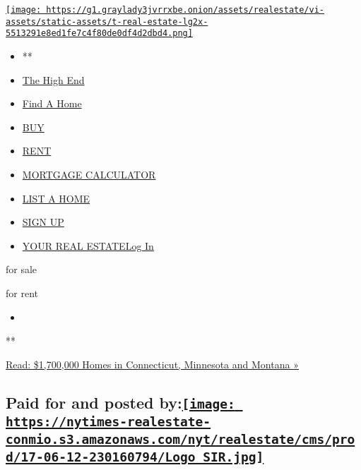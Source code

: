 \href{/section/realestate}{\texttt{[image: https://g1.graylady3jvrrxbe.onion/assets/realestate/vi-assets/static-assets/t-real-estate-lg2x-5513291e8ed1fe7c4f80de0df4d2dbd4.png]}}

\begin{itemize}
\tightlist
\item
  **
\item
  \href{/real-estate/the-high-end}{The High End}
\item
  \href{/real-estate/find-a-home}{Find A Home}
\item
  \href{/real-estate/homes-for-sale}{BUY}
\item
  \href{/real-estate/homes-for-rent}{RENT}
\item
  \href{/real-estate/mortgage-calculator}{MORTGAGE CALCULATOR}
\item
  \href{https://nytimesads.gtspayments.com}{LIST A HOME}
\item
  \href{https://myaccount.nytimes3xbfgragh.onion/auth/register?client_id=real.estate.ui\&display=control\&redirect_uri=\%2Freal-estate\%2Ffind-a-home\%3F\&response_type=cookie}{SIGN
  UP}
\item
  \href{https://myaccount.nytimes3xbfgragh.onion/auth/login?client_id=real.estate.ui\&display=control\&redirect_uri=\%2Freal-estate\%2Ffind-a-home\%3F\&response_type=cookie}{YOUR
  REAL ESTATELog In}
\end{itemize}

for sale

for rent

\begin{itemize}
\item
\end{itemize}

**

\href{https://www.nytimes3xbfgragh.onion/2017/02/22/realestate/compare-homes-in-connecticut-minnesota-and-montana.html}{Read:
\$1,700,000 Homes in Connecticut, Minnesota and Montana »}

\hypertarget{paid-for-and-posted-bysothebys-international-realty-logo}{%
\subsection[Paid for and posted by:]{\texorpdfstring{Paid for and posted
by:\href{http://www.sothebysrealty.com/eng}{\protect\texttt{[image: https://nytimes-realestate-conmio.s3.amazonaws.com/nyt/realestate/cms/prod/17-06-12-230160794/Logo\_SIR.jpg]}}}{Paid for and posted by:Sotheby's International Realty logo}}\label{paid-for-and-posted-bysothebys-international-realty-logo}}

